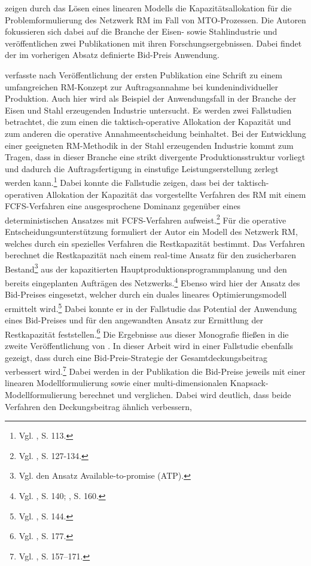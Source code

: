 
\cite{rehkopf:2005aa} zeigen durch das Lösen eines linearen Modells die Kapazitätsallokation für die Problemformulierung des Netzwerk RM im Fall von MTO-Prozessen. Die Autoren fokussieren sich dabei auf die Branche der Eisen- sowie Stahlindustrie und veröffentlichen zwei Publikationen mit ihren Forschungsergebnissen. Dabei findet der im vorherigen Absatz definierte Bid-Preis Anwendung. 

\cite{rehkopf2007revenue} verfasste nach Veröffentlichung der ersten Publikation eine Schrift zu einem umfangreichen RM-Konzept zur Auftragsannahme bei kundenindividueller Produktion. Auch hier wird als Beispiel der Anwendungsfall in der Branche der Eisen und Stahl erzeugenden Industrie untersucht. Es werden zwei Fallstudien betrachtet, die zum einen die taktisch-operative Allokation der Kapazität und zum anderen die operative Annahmeentscheidung beinhaltet. Bei der Entwicklung einer geeigneten RM-Methodik in der Stahl erzeugenden Industrie kommt zum Tragen, dass in dieser Branche eine strikt divergente Produktionsstruktur vorliegt und dadurch die Auftragsfertigung in einstufige Leistungserstellung zerlegt werden kann.\footnote{Vgl. \cite{rehkopf2007revenue}, S. 113.} Dabei konnte die Fallstudie zeigen, dass bei der taktisch-operativen Allokation der Kapazität das vorgestellte Verfahren des RM mit einem FCFS-Verfahren eine ausgesprochene Dominanz gegenüber eines deterministischen Ansatzes mit FCFS-Verfahren aufweist.\footnote{Vgl. \cite{rehkopf2007revenue}, S. 127-134.} Für die operative Entscheidungsunterstützung formuliert der Autor ein Modell des Netzwerk RM, welches durch ein spezielles Verfahren die Restkapazität bestimmt. Das Verfahren berechnet die Restkapazität nach einem real-time Ansatz für den zusicherbaren Bestand\footnote{Vgl. den Ansatz \glqq Available-to-promise (ATP)\grqq.} aus der kapazitierten Hauptproduktionsprogrammplanung und den bereits eingeplanten Aufträgen des Netzwerks.\footnote{Vgl. \cite{rehkopf2007revenue}, S. 140; \cite{Spengler:2007aa}, S. 160.} Ebenso wird hier der Ansatz des Bid-Preises eingesetzt, welcher durch ein duales lineares Optimierungsmodell ermittelt wird.\footnote{Vgl. \cite{rehkopf2007revenue}, S. 144.} Dabei konnte er in der Fallstudie das Potential der Anwendung eines Bid-Preises und für den angewandten Ansatz zur Ermittlung der Restkapazität feststellen.\footnote{Vgl. \cite{rehkopf2007revenue}, S. 177.} Die Ergebnisse aus dieser Monografie fließen in die zweite Veröffentlichung von \cite{Spengler:2007aa}. In dieser Arbeit wird in einer Fallstudie ebenfalls gezeigt, dass durch eine Bid-Preis-Strategie der Gesamtdeckungsbeitrag verbessert wird.\footnote{Vgl. \cite{Spengler:2007aa}, S. 157–171.} Dabei werden in der Publikation die Bid-Preise jeweils mit einer linearen Modellformulierung sowie einer multi-dimensionalen Knapsack-Modell\-for\-mu\-lier\-ung berechnet und verglichen. Dabei wird deutlich, dass beide Verfahren den Deckungsbeitrag ähnlich verbessern, 